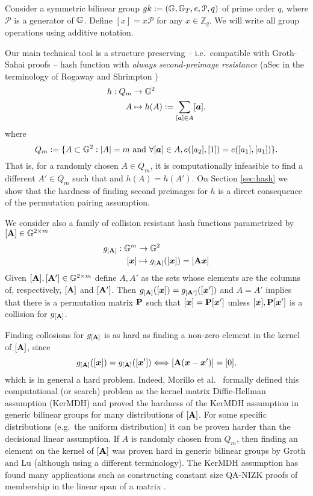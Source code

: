 Consider a symmetric bilinear group $gk:=(\mathbb{G},\mathbb{G}_T,e,\mathcal{P},q)$ of prime order $q$, where $\mathcal{P}$ is a generator of $\mathbb{G}$. Define $[x]=x\mathcal{P}$ for any $x\in\mathbb{Z}_q$.  We will write all group operations using additive notation.

Our main technical tool is a structure preserving -- i.e.~compatible with Groth-Sahai proofs -- hash function with \emph{always second-preimage resistance} (aSec in the terminology of Rogaway and Shrimpton \cite{FSE:RogShr04})
\begin{align*}
h : Q_m &\to \mathbb{G}^2\\
      A &\mapsto h(A) := \sum_{[{\boldsymbol{a}}]\in A} [{\boldsymbol{a}}],
\end{align*}
 where
$$
Q_m:= \{A\subset\mathbb{G}^2: |A|=m \text{ and }\forall [{\boldsymbol{a}}]\in A, e([a_2],[1])=e([a_1],[a_1])\}.
$$
That is, for a randomly chosen $A\in Q_m$, it is computationally infeasible to find a different $A'\in Q_m$ such that and $h(A)=h(A')$. On Section \ref{sec:hash} we show that the hardness of finding second preimages for $h$ is a direct consequence of the permutation pairing assumption.

We consider also a family of collision resistant hash functions parametrized by $[\mathbf{{A}}]\in\mathbb{G}^{2\times m}$
\begin{align*}
g_{[\matr{A}]} : \GG^m &\to \GG^2\\
           [\vecb{x}] &\mapsto g_{[\matr{A}]}([\vecb{x}]) = [\matr{A}\vecb{x}]
\end{align*}
Given $[\mathbf{{A}}],[\mathbf{{A}}']\in\mathbb{G}^{2\times m}$ define $A,A'$ as the sets whose elements are the columns of, respectively, $[\mathbf{{A}}]$ and $[\mathbf{{A}}']$. Then $g_{[\mathbf{{A}}]}([{\boldsymbol{x}}]) = g_{[\mathbf{{A}}']}([{\boldsymbol{x}}'])$ and $A=A'$ implies that there is a permutation matrix $\mathbf{{P}}$ such that $[{\boldsymbol{x}}]=\mathbf{{P}}[{\boldsymbol{x}}']$ unless $[{\boldsymbol{x}}],\mathbf{{P}}[{\boldsymbol{x}}']$ is a collision for $g_{[\mathbf{{A}}]}$.
 
 Finding collosions for $g_{[\mathbf{{A}}]}$ is as hard as finding a non-zero element in the kernel of $[\mathbf{{A}}]$, since
$$
g_{[\mathbf{{A}}]}([{\boldsymbol{x}}]) = g_{[\mathbf{{A}}]}([{\boldsymbol{x}}']) \Longleftrightarrow [\mathbf{{A}}({\boldsymbol{x}}-{\boldsymbol{x}}')]=[0],
$$
which is in general a hard problem. Indeed,
Morillo et al.~\cite{AC:MorRafVil16} formally defined this computational (or search) problem as the kernel matrix Diffie-Hellman assumption (KerMDH) and proved the hardness of the KerMDH assumption in generic bilinear groups for many distributions of $[\mathbf{{A}}]$. For some specific distributions (e.g.~the uniform distribution) it can be proven harder than the decisional linear assumption. If $A$ is randomly chosen from $Q_m$, then finding an element on the kernel of $[\mathbf{{A}}]$ was proven hard in generic bilinear groups by Groth and Lu \cite{AC:GroLu07} (although using a different terminology).
The KerMDH assumption has found many applications such as constructing constant size QA-NIZK proofs of membership in the linear span of a matrix \cite{EC:LPJY14,EC:KilWee15}.

